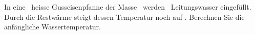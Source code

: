In eine \TPO\ heisse Gusseisenpfanne der Masse \mPfO\ werden \VWO\ Leitungswasser eingefüllt. Durch die Restwärme steigt dessen Temperatur noch auf \TmO. Berechnen Sie die anfängliche Wassertemperatur.
